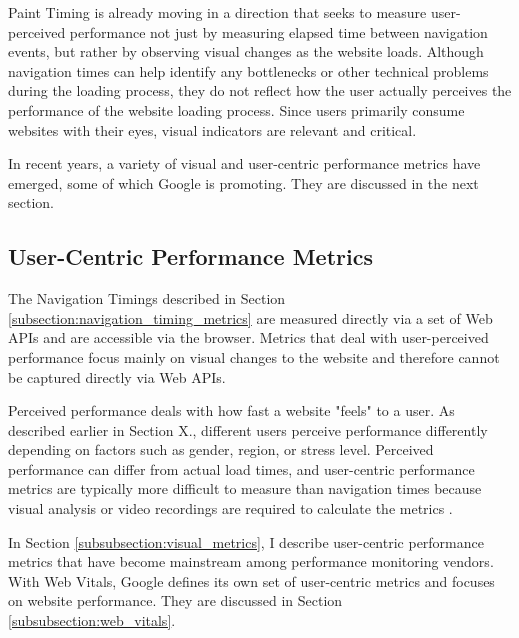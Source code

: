 
Paint Timing is already moving in a direction that seeks to measure user-perceived performance not just by measuring elapsed time between navigation events, but rather by observing visual changes as the website loads.
Although navigation times can help identify any bottlenecks or other technical problems during the loading process, they do not reflect how the user actually perceives the performance of the website loading process.
Since users primarily consume websites with their eyes, visual indicators are relevant and critical.

In recent years, a variety of visual and user-centric performance metrics have emerged, some of which Google is promoting.
They are discussed in the next section.


\subsection{User-Centric Performance Metrics} %
\label{subsection:user_centric_performance_metrics}


The Navigation Timings described in Section \ref{subsection:navigation_timing_metrics} are measured directly via a set of Web APIs and are accessible via the browser.
Metrics that deal with user-perceived performance focus mainly on visual changes to the website and therefore cannot be captured directly via Web APIs.

Perceived performance deals with how fast a website "feels" to a user.
As described earlier in Section X., different users perceive performance differently depending on factors such as gender, region, or stress level.
Perceived performance can differ from actual load times, and user-centric performance metrics are typically more difficult to measure than navigation times because visual analysis or video recordings are required to calculate the metrics \cite{2021MDNPerceivedPerformance}.

In Section \ref{subsubsection:visual_metrics}, I describe user-centric performance metrics that have become mainstream among performance monitoring vendors.
With Web Vitals, Google defines its own set of user-centric metrics and focuses on website performance.
They are discussed in Section \ref{subsubsection:web_vitals}.

